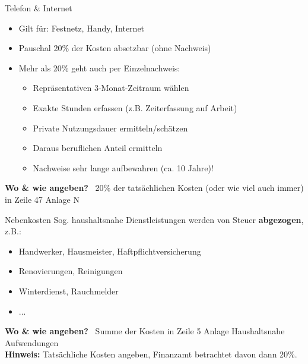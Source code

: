 \documentclass{beamer}
\begin{document}
			\begin{frame}{Telefon \& Internet}
				\begin{itemize}
					\item Gilt für: Festnetz, Handy, Internet
					\item Pauschal 20\% der Kosten absetzbar (ohne Nachweis)
					\item Mehr als 20\% geht auch per Einzelnachweis:
					\begin{itemize}
						\item Repräsentativen 3-Monat-Zeitraum wählen
						\item Exakte Stunden erfassen (z.B. Zeiterfassung auf Arbeit)
						\item Private Nutzungsdauer ermitteln/schätzen
						\item Daraus beruflichen Anteil ermitteln
						\item Nachweise sehr lange aufbewahren (ca. 10 Jahre)!
					\end{itemize}
				\end{itemize}\n\pause
				\textbf{Wo \& wie angeben?} \textrightarrow\ 20\% der tatsächlichen Kosten (oder wie viel auch immer) in Zeile 47 Anlage N
			\end{frame}
		
			\begin{frame}{Nebenkosten}
				Sog. haushaltsnahe Dienstleistungen werden von Steuer \textbf{abgezogen}, z.B.:
				\begin{itemize}
					\item Handwerker, Hausmeister, Haftpflichtversicherung
					\item Renovierungen, Reinigungen
					\item Winterdienst, Rauchmelder
					\item ...
				\end{itemize}\n
				\textbf{Wo \& wie angeben?} \textrightarrow\ Summe der Kosten in Zeile 5 Anlage Haushaltsnahe Aufwendungen\\\pause
				\textbf{Hinweis:} Tatsächliche Kosten angeben, Finanzamt betrachtet davon dann 20\%.
			\end{frame}
		
\end{document}
